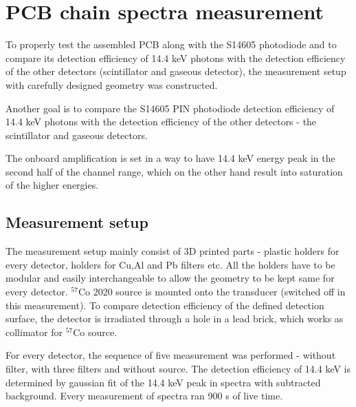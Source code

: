 \chapter{PCB chain spectra measurement} 

To properly test the assembled PCB along with the S14605 photodiode and to compare its detection efficiency of 14.4 keV photons with the detection efficiency of the other detectors (scintillator and gaseous detector), the measurement setup with carefully designed geometry was constructed.

\par

Another goal is to compare the S14605 PIN photodiode detection efficiency of 14.4 keV photons with the detection efficiency of the other detectors - the scintillator and gaseous detectors.

\par

The onboard amplification is set in a way to have 14.4 keV energy peak in the second half of the channel range, which on the other hand result into saturation of the higher energies. 



\section{Measurement setup}
The measurement setup mainly consist of 3D printed parts - plastic holders for every detector, holders for Cu,Al and Pb filters etc. All the holders have to be modular and easily interchangeable to allow the geometry to be kept same for every detector.
$^{57}$Co 2020 source is mounted onto the transducer (switched off in this measurement). To compare detection efficiency of the defined detection surface, the detector is irradiated through a hole in a lead brick, which works as collimator for $^{57}$Co source.

\par
For every detector, the sequence of five measurement was performed - without filter, with three filters and without source. The detection efficiency of 14.4 keV is determined by gaussian fit of the 14.4 keV peak in spectra with subtracted background. Every measurement of spectra ran 900 s of live time.


